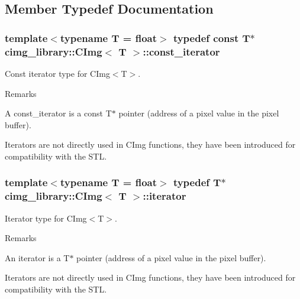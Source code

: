 \subsection{Member Typedef Documentation}
\hypertarget{structcimg__library_1_1_c_img_ad444f21017aaa7da6fab45930d3579aa}{
\subsubsection[{const\-\_\-iterator}]{\setlength{\rightskip}{0pt plus 5cm}template$<$typename T = float$>$ typedef const T$\ast$ {\bf cimg\-\_\-library\-::\-C\-Img}$<$ T $>$\-::{\bf const\-\_\-iterator}}}\label{structcimg__library_1_1_c_img_ad444f21017aaa7da6fab45930d3579aa}


Const iterator type for C\-Img$<$\-T$>$. 

\begin{DoxyRemark}{Remarks}

\begin{DoxyItemize}
\item A {\ttfamily const\-\_\-iterator} is a {\ttfamily const T$\ast$} pointer (address of a pixel value in the pixel buffer).
\item Iterators are not directly used in C\-Img functions, they have been introduced for compatibility with the S\-T\-L. 
\end{DoxyItemize}
\end{DoxyRemark}
\hypertarget{structcimg__library_1_1_c_img_a3ff3f07802e67c4ba930427ea45655c8}{
\subsubsection[{iterator}]{\setlength{\rightskip}{0pt plus 5cm}template$<$typename T = float$>$ typedef T$\ast$ {\bf cimg\-\_\-library\-::\-C\-Img}$<$ T $>$\-::{\bf iterator}}}\label{structcimg__library_1_1_c_img_a3ff3f07802e67c4ba930427ea45655c8}


Iterator type for C\-Img$<$\-T$>$. 

\begin{DoxyRemark}{Remarks}

\begin{DoxyItemize}
\item An {\ttfamily iterator} is a {\ttfamily T$\ast$} pointer (address of a pixel value in the pixel buffer).
\item Iterators are not directly used in C\-Img functions, they have been introduced for compatibility with the S\-T\-L. 
\end{DoxyItemize}
\end{DoxyRemark}



